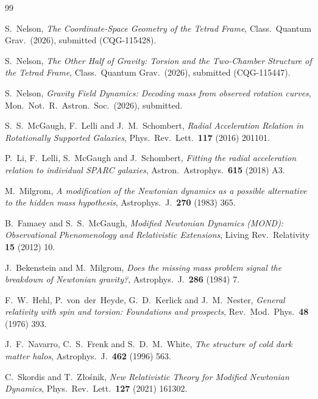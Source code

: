\documentclass[twocolumn]{iopjournal}
\begin{document}

\begin{thebibliography}{99}

S.~Nelson,
\textit{The Coordinate-Space Geometry of the Tetrad Frame},
Class.\ Quantum Grav.\ (2026), submitted (CQG-115428).

S.~Nelson,
\textit{The Other Half of Gravity: Torsion and the
Two-Chamber Structure of the Tetrad Frame},
Class.\ Quantum Grav.\ (2026), submitted (CQG-115447).

S.~Nelson,
\textit{Gravity Field Dynamics: Decoding mass from observed
rotation curves},
Mon.\ Not.\ R.\ Astron.\ Soc.\ (2026), submitted.

S.~S.~McGaugh, F.~Lelli and J.~M.~Schombert,
\textit{Radial Acceleration Relation in Rotationally
Supported Galaxies},
Phys.\ Rev.\ Lett.\ \textbf{117} (2016) 201101.

P.~Li, F.~Lelli, S.~McGaugh and J.~Schombert,
\textit{Fitting the radial acceleration relation to
individual SPARC galaxies},
Astron.\ Astrophys.\ \textbf{615} (2018) A3.

M.~Milgrom,
\textit{A modification of the Newtonian dynamics as a
possible alternative to the hidden mass hypothesis},
Astrophys.\ J.\ \textbf{270} (1983) 365.

B.~Famaey and S.~S.~McGaugh,
\textit{Modified Newtonian Dynamics (MOND): Observational
Phenomenology and Relativistic Extensions},
Living Rev.\ Relativity \textbf{15} (2012) 10.

J.~Bekenstein and M.~Milgrom,
\textit{Does the missing mass problem signal the breakdown
of Newtonian gravity?},
Astrophys.\ J.\ \textbf{286} (1984) 7.

F.~W.~Hehl, P.~von~der~Heyde, G.~D.~Kerlick and
J.~M.~Nester,
\textit{General relativity with spin and torsion:
Foundations and prospects},
Rev.\ Mod.\ Phys.\ \textbf{48} (1976) 393.

J.~F.~Navarro, C.~S.~Frenk and S.~D.~M.~White,
\textit{The structure of cold dark matter halos},
Astrophys.\ J.\ \textbf{462} (1996) 563.

C.~Skordis and T.~Z\l{}o\'{s}nik,
\textit{New Relativistic Theory for Modified Newtonian
Dynamics},
Phys.\ Rev.\ Lett.\ \textbf{127} (2021) 161302.

\end{thebibliography}
\end{document}
